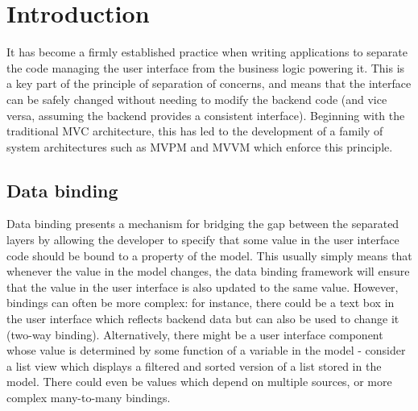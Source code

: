 \documentclass[12pt,twoside,notitlepage]{report}
\begin{document}
\cleardoublepage

\tableofcontents

\listoffigures

\newpage



\cleardoublepage

\setcounter{page}{1}
\pagestyle{headings}



\chapter{Introduction}

It has become a firmly established practice when writing applications to separate the code managing the user interface from the business logic powering it. This is a key part of the principle of separation of concerns, and means that the interface can be safely changed without needing to modify the backend code (and vice versa, assuming the backend provides a consistent interface). Beginning with the traditional MVC architecture, this has led to the development of a family of system architectures such as MVPM and MVVM which enforce this principle.

\section{Data binding}

Data binding presents a mechanism for bridging the gap between the separated layers by allowing the developer to specify that some value in the user interface code should be bound to a property of the model. This usually simply means that whenever the value in the model changes, the data binding framework will ensure that the value in the user interface is also updated to the same value. However, bindings can often be more complex: for instance, there could be a text box in the user interface which reflects backend data but can also be used to change it (two-way binding). Alternatively, there might be a user interface component whose value is determined by some function of a variable in the model - consider a list view which displays a filtered and sorted version of a list stored in the model. There could even be values which depend on multiple sources, or more complex many-to-many bindings.
\end{document}
